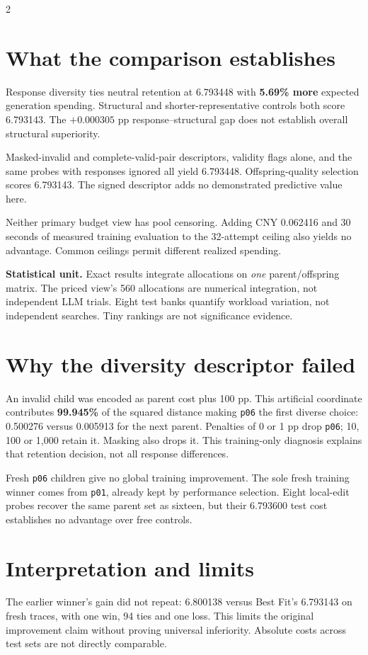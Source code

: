 \documentclass[10pt,letterpaper]{article}
\begin{document}
\begin{multicols}{2}
\section{What the comparison establishes}
Response diversity ties neutral retention at 6.793448 with \textbf{5.69\% more} expected generation spending. Structural and shorter-representative controls both score 6.793143. The $+0.000305$ pp response--structural gap does not establish overall structural superiority.

Masked-invalid and complete-valid-pair descriptors, validity flags alone, and the same probes with responses ignored all yield 6.793448. Offspring-quality selection scores 6.793143. The signed descriptor adds no demonstrated predictive value here.

Neither primary budget view has pool censoring. Adding CNY 0.062416 and 30 seconds of measured training evaluation to the 32-attempt ceiling also yields no advantage. Common ceilings permit different realized spending.

\textbf{Statistical unit.} Exact results integrate allocations on \emph{one} parent/offspring matrix. The priced view's 560 allocations are numerical integration, not independent LLM trials. Eight test banks quantify workload variation, not independent searches. Tiny rankings are not significance evidence.

\section{Why the diversity descriptor failed}
An invalid child was encoded as parent cost plus 100 pp. This artificial coordinate contributes \textbf{99.945\%} of the squared distance making \texttt{p06} the first diverse choice: 0.500276 versus 0.005913 for the next parent. Penalties of 0 or 1 pp drop \texttt{p06}; 10, 100 or 1,000 retain it. Masking also drops it. This training-only diagnosis explains that retention decision, not all response differences.

Fresh \texttt{p06} children give no global training improvement. The sole fresh training winner comes from \texttt{p01}, already kept by performance selection. Eight local-edit probes recover the same parent set as sixteen, but their 6.793600 test cost establishes no advantage over free controls.

\section{Interpretation and limits}
The earlier winner's gain did not repeat: 6.800138 versus Best Fit's 6.793143 on fresh traces, with one win, 94 ties and one loss. This limits the original improvement claim without proving universal inferiority. Absolute costs across test sets are not directly comparable.


\end{multicols}
\end{document}
